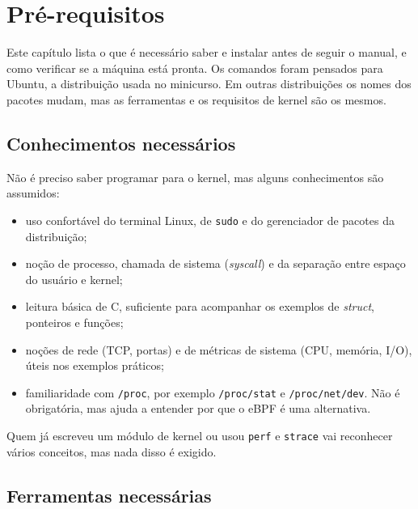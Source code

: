 \chapter{Pré-requisitos}\label{cap:prerequisitos}

Este capítulo lista o que é necessário saber e instalar antes de seguir o manual, e como verificar se a máquina está pronta. Os comandos foram pensados para Ubuntu, a distribuição usada no minicurso. Em outras distribuições os nomes dos pacotes mudam, mas as ferramentas e os requisitos de kernel são os mesmos.

\section{Conhecimentos necessários}

Não é preciso saber programar para o kernel, mas alguns conhecimentos são assumidos:

\begin{itemize}
  \item uso confortável do terminal Linux, de \texttt{sudo} e do gerenciador de pacotes da distribuição;
  \item noção de processo, chamada de sistema (\textit{syscall}) e da separação entre espaço do usuário e kernel;
  \item leitura básica de C, suficiente para acompanhar os exemplos de \textit{struct}, ponteiros e funções;
  \item noções de rede (TCP, portas) e de métricas de sistema (CPU, memória, I/O), úteis nos exemplos práticos;
  \item familiaridade com \texttt{/proc}, por exemplo \texttt{/proc/stat} e \texttt{/proc/net/dev}. Não é obrigatória, mas ajuda a entender por que o eBPF é uma alternativa.
\end{itemize}

Quem já escreveu um módulo de kernel ou usou \texttt{perf} e \texttt{strace} vai reconhecer vários conceitos, mas nada disso é exigido.

\section{Ferramentas necessárias}

